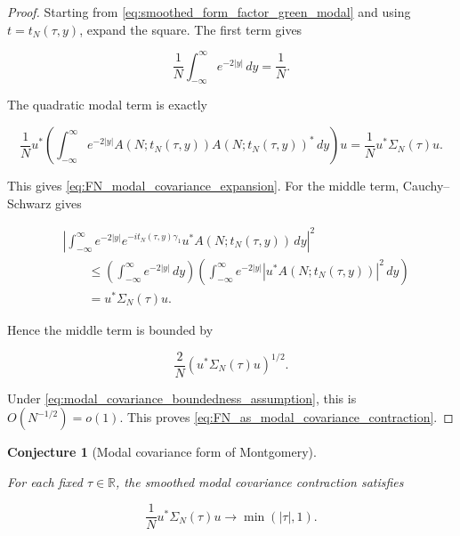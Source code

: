 \documentclass[11pt]{amsart}
\numberwithin{equation}{section}
\theoremstyle{plain}
\newtheorem{conjecture}[theorem]{Conjecture}
\theoremstyle{definition}
\theoremstyle{remark}
\begin{document}
\begin{proof}
Starting from \eqref{eq:smoothed_form_factor_green_modal} and using
\(t=t_N(\tau,y)\), expand the square. The first term gives

\begin{equation}
\frac1N
\int_{-\infty}^{\infty}e^{-2|y|}\,dy
=
\frac1N.
\end{equation}

The quadratic modal term is exactly

\begin{equation}
\frac1N
u^*
\left(
\int_{-\infty}^{\infty}
e^{-2|y|}
A(N;t_N(\tau,y))A(N;t_N(\tau,y))^*
\,dy
\right)
u
=
\frac1N u^*\Sigma_N(\tau)u.
\end{equation}

This gives \eqref{eq:FN_modal_covariance_expansion}. For the middle
term, Cauchy--Schwarz gives

\begin{align}
&\left|
\int_{-\infty}^{\infty}
e^{-2|y|}
e^{-it_N(\tau,y)\gamma_1}
u^*A(N;t_N(\tau,y))\,dy
\right|^2
\nonumber\\
&\qquad\le
\left(\int_{-\infty}^{\infty}e^{-2|y|}\,dy\right)
\left(
\int_{-\infty}^{\infty}
e^{-2|y|}
|u^*A(N;t_N(\tau,y))|^2\,dy
\right)
\nonumber\\
&\qquad=
u^*\Sigma_N(\tau)u.
\label{eq:modal_covariance_middle_term_bound}
\end{align}

Hence the middle term is bounded by

\begin{equation}
\frac{2}{N}
\left(u^*\Sigma_N(\tau)u\right)^{1/2}.
\end{equation}

Under \eqref{eq:modal_covariance_boundedness_assumption}, this is
\(O(N^{-1/2})=o(1)\). This proves
\eqref{eq:FN_as_modal_covariance_contraction}.
\end{proof}

\begin{conjecture}[Modal covariance form of Montgomery]
\label{conj:modal_covariance_montgomery}

For each fixed \(\tau\in\mathbb R\), the smoothed modal covariance
contraction satisfies

\begin{equation}
\frac1N
u^*\Sigma_N(\tau)u
\longrightarrow
\min(|\tau|,1).
\label{eq:modal_covariance_montgomery_conjecture}
\end{equation}

\end{conjecture}
\end{document}
